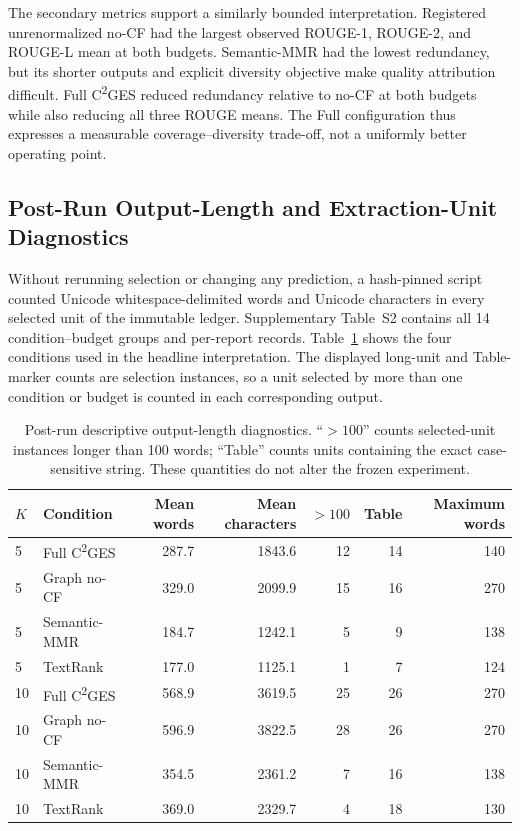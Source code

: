 \documentclass[applsci,article,submit,moreauthors]{Definitions/mdpi}
\newcommand{\cges}{C\textsuperscript{2}GES}
\begin{document}
The secondary metrics support a similarly bounded interpretation. Registered unrenormalized no-CF had the largest observed ROUGE-1, ROUGE-2, and ROUGE-L mean at both budgets. Semantic-MMR had the lowest redundancy, but its shorter outputs and explicit diversity objective make quality attribution difficult. Full \cges{} reduced redundancy relative to no-CF at both budgets while also reducing all three ROUGE means. The Full configuration thus expresses a measurable coverage--diversity trade-off, not a uniformly better operating point.

\subsection{Post-Run Output-Length and Extraction-Unit Diagnostics}

Without rerunning selection or changing any prediction, a hash-pinned script counted Unicode whitespace-delimited words and Unicode characters in every selected unit of the immutable ledger. Supplementary Table~S2 contains all 14 condition--budget groups and per-report records. Table~\ref{tab:length-audit} shows the four conditions used in the headline interpretation. The displayed long-unit and Table-marker counts are selection instances, so a unit selected by more than one condition or budget is counted in each corresponding output.

\begin{table}[H]
\caption{Post-run descriptive output-length diagnostics. ``$>100$'' counts selected-unit instances longer than 100 words; ``Table'' counts units containing the exact case-sensitive string. These quantities do not alter the frozen experiment.}
\label{tab:length-audit}\centering\small
\begin{tabular}{llrrrrr}
\toprule
$K$ & Condition & Mean words & Mean characters & $>100$ & Table & Maximum words\\
\midrule
5 & Full \cges{} & 287.7 & 1843.6 & 12 & 14 & 140\\
5 & Graph no-CF & 329.0 & 2099.9 & 15 & 16 & 270\\
5 & Semantic-MMR & 184.7 & 1242.1 & 5 & 9 & 138\\
5 & TextRank & 177.0 & 1125.1 & 1 & 7 & 124\\
10 & Full \cges{} & 568.9 & 3619.5 & 25 & 26 & 270\\
10 & Graph no-CF & 596.9 & 3822.5 & 28 & 26 & 270\\
10 & Semantic-MMR & 354.5 & 2361.2 & 7 & 16 & 138\\
10 & TextRank & 369.0 & 2329.7 & 4 & 18 & 130\\
\bottomrule
\end{tabular}
\end{table}
\end{document}
